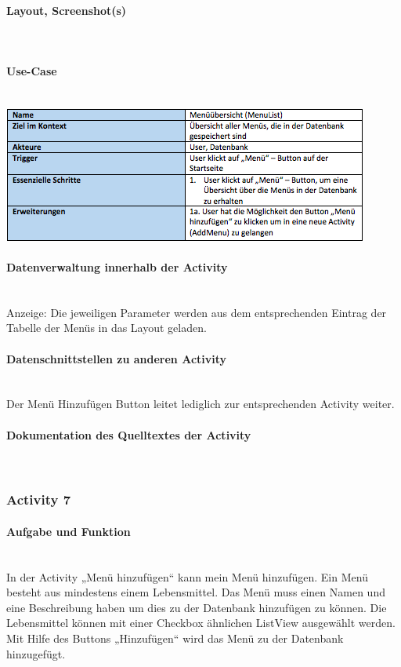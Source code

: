 \paragraph{Layout, Screenshot(s)}\\
\paragraph{Use-Case}$~~$\\
\newline
\includegraphics[scale=1]{img/usecasemenulist}\\
\paragraph{Datenverwaltung innerhalb der Activity}\\
Anzeige: Die jeweiligen Parameter werden aus dem entsprechenden Eintrag der Tabelle der Menüs in das Layout geladen. 

\paragraph{Datenschnittstellen zu anderen Activity}\\
Der Menü Hinzufügen Button leitet lediglich zur entsprechenden Activity weiter.

\paragraph{Dokumentation des Quelltextes der Activity}\\

\subsubsection{Activity 7}

\paragraph{Aufgabe und Funktion}\\
In der Activity „Menü hinzufügen“ kann mein Menü hinzufügen. Ein Menü besteht aus mindestens einem Lebensmittel. Das Menü muss einen Namen und eine Beschreibung haben um dies zu der Datenbank hinzufügen zu können. Die Lebensmittel können mit einer Checkbox ähnlichen ListView ausgewählt werden. Mit Hilfe des Buttons „Hinzufügen“ wird das Menü zu der Datenbank hinzugefügt.

